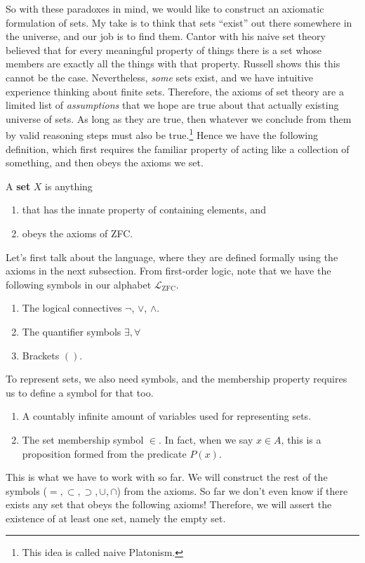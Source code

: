 \documentclass{article}
\begin{document}
    So with these paradoxes in mind, we would like to construct an axiomatic formulation of sets. My take is to think that sets ``exist'' out there somewhere in the universe, and our job is to find them. Cantor with his naive set theory believed that for every meaningful property of things there is a set whose members are exactly all the things with that property. Russell shows this this cannot be the case. Nevertheless, \textit{some} sets exist, and we have intuitive experience thinking about finite sets. Therefore, the axioms of set theory are a limited list of \textit{assumptions} that we hope are true about that actually existing universe of sets. As long as they are true, then whatever we conclude from them by valid reasoning steps must also be true.\footnote{This idea is called naive Platonism.} Hence we have the following definition, which first requires the familiar property of acting like a collection of something, and then obeys the axioms we set. 
    
    \begin{definition}[Set]
      A \textbf{set} $X$ is anything 
      \begin{enumerate}
        \item that has the innate property of containing elements, and 
        \item obeys the axioms of ZFC. 
      \end{enumerate}
    \end{definition}  

    Let's first talk about the language, where they are defined formally using the axioms in the next subsection. From first-order logic, note that we have the following symbols in our alphabet $\mathcal{L}_{\mathrm{ZFC}}$. 
    \begin{enumerate}
      \item The logical connectives $\neg$, $\lor$, $\land$. 
      \item The quantifier symbols $\exists, \forall$ 
      \item Brackets $()$. 
    \end{enumerate}
    To represent sets, we also need symbols, and the membership property requires us to define a symbol for that too. 
    \begin{enumerate}
      \item A countably infinite amount of variables used for representing sets. 
      \item The set membership symbol $\in$. In fact, when we say $x \in A$, this is a proposition formed from the predicate $P(x)$. 
    \end{enumerate} 
    This is what we have to work with so far. We will construct the rest of the symbols ($=, \subset, \supset, \cup, \cap$) from the axioms. So far we don't even know if there exists any set that obeys the following axioms! Therefore, we will assert the existence of at least one set, namely the empty set. 
\end{document}
